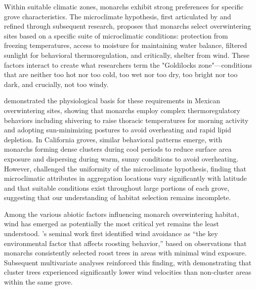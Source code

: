 Within suitable climatic zones, monarchs exhibit strong preferences for specific grove characteristics. The microclimate hypothesis, first articulated by \citet{leongMicroenvironmentalFactorsAssociated1990a} and refined through subsequent research, proposes that monarchs select overwintering sites based on a specific suite of microclimatic conditions: protection from freezing temperatures, access to moisture for maintaining water balance, filtered sunlight for behavioral thermoregulation, and critically, shelter from wind. These factors interact to create what researchers term the "Goldilocks zone"---conditions that are neither too hot nor too cold, too wet nor too dry, too bright nor too dark, and crucially, not too windy.

\citet{Masters1988_ACNENTPT} demonstrated the physiological basis for these requirements in Mexican overwintering sites, showing that monarchs employ complex thermoregulatory behaviors including shivering to raise thoracic temperatures for morning activity and adopting sun-minimizing postures to avoid overheating and rapid lipid depletion. In California groves, similar behavioral patterns emerge, with monarchs forming dense clusters during cool periods to reduce surface area exposure and dispersing during warm, sunny conditions to avoid overheating. However, \citet{Saniee2022_3VN7I68M} challenged the uniformity of the microclimate hypothesis, finding that microclimatic attributes in aggregation locations vary significantly with latitude and that suitable conditions exist throughout large portions of each grove, suggesting that our understanding of habitat selection remains incomplete.


Among the various abiotic factors influencing monarch overwintering habitat, wind has emerged as potentially the most critical yet remains the least understood. \citet{leongMicroenvironmentalFactorsAssociated1990a}'s seminal work first identified wind avoidance as ``the key environmental factor that affects roosting behavior,'' based on observations that monarchs consistently selected roost trees in areas with minimal wind exposure. Subsequent multivariate analyses reinforced this finding, with \citet{leongUseMultivariateAnalyses1991} demonstrating that cluster trees experienced significantly lower wind velocities than non-cluster areas within the same grove.

